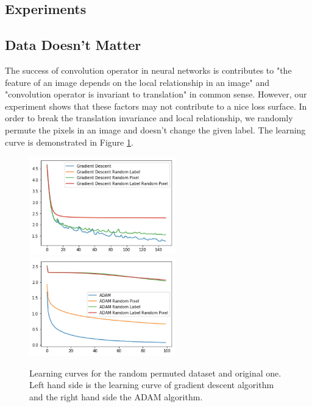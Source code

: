 \documentclass{article}
\theoremstyle{plain}
\theoremstyle{definition}
\begin{document}




\subsection{Experiments}





\subsection{Data Doesn't Matter}

The success of convolution operator in neural networks is contributes to "the feature of an image depends on the local relationship in an image" and "convolution operator is invariant to translation" in common sense. However, our experiment shows that these factors may not contribute to a nice loss surface. In order to break the translation invariance and local relationship, we randomly permute the pixels in an image and doesn't change the given label. The learning curve is demonstrated in Figure \ref{randomperb}.

\begin{figure}[htp]
	\centering
	\includegraphics[width=2.5in]{gdrp.jpg}
	\includegraphics[width=2.5in]{adamrp.jpg}
	\caption{Learning curves for the random permuted dataset and original one. Left hand side is the learning curve of gradient descent algorithm and the right hand side the ADAM algorithm.}
	\label{randomperb}
\end{figure}
\end{document}
